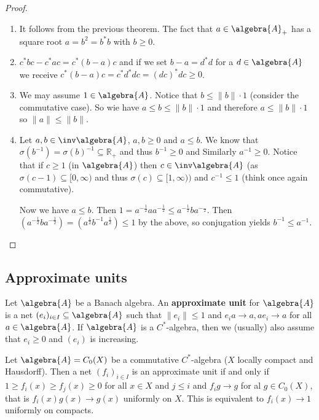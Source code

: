 \documentclass[a4paper]{article}
\begin{document}
\begin{proof}~
	\begin{enumerate}
		\item It follows from the previous theorem. The fact that $a \in \algebra{A}_+$ has a square root $a = b^2 = b^* b$  with $b \geq 0$.
		\item $c^* b c - c^* a c = c^* (b - a) c$ and if we set $b - a = d^* d$ for a $d \in \algebra{A}$ we receive $c^*(b-a)c = c^* d^* d c = (dc)^* dc \geq 0$.
		\item We may assume $1 \in \algebra{A}$.
		Notice that $b \leq \|b\| \cdot 1$ (consider the commutative case).
		So wie have $a \leq b \leq \|b\| \cdot 1$ and therefore $a \leq \|b\| \cdot 1$ so $\|a\| \leq \|b\|$.
		\item Let $a,b \in \inv \algebra{A}$, $a,b \geq 0$ and $a \leq b$.
		We know that $\sigma(b^{-1}) = \sigma(b)^{-1} \subseteq \mathds{R}_+$ and thus $b^{-1} \geq 0$ and Similarly $a^{-1} \geq 0$.
		Notice that if $c \geq 1$ (in $\algebra{A}$) then $c \in \inv \algebra{A}$ (as $\sigma(c-1) \subseteq [0, \infty)$ and thus $\sigma(c) \subseteq [1, \infty))$ and $c^{-1} \leq 1$ (think once again commutative).

		Now we have $a \leq b$.
		Then $1 = a^{-\frac{1}{2}} a a^{-\frac{1}{2}} \leq a^{-\frac{1}{2}} b a^{-\frac{}{2}}$.
		Then $(a^{-\frac{1}{2}} b a^{-\frac{1}{2}}) = (a^\frac{1}{2} b^{-1} a^\frac{1}{2}) \leq 1$ by the above, so conjugation yields $b^{-1} \leq a^{-1}$.
	\end{enumerate}
\end{proof}

\subsection{Approximate units}

\begin{definition}
	Let $\algebra{A}$ be a Banach algebra. An \textbf{approximate unit} for $\algebra{A}$ is a net $(e_i)_{i \in I} \subseteq \algebra{A}$ such that $\|e_i\| \leq 1$ and $e_i a \to a, a e_i \to a$ for all $a \in \algebra{A}$. If $\algebra{A}$ is a $C^*$-algebra, then we (usually) also assume that $e_i \geq 0$ and $(e_i)$ is increasing.
\end{definition}

\begin{example}
	Let $\algebra{A} = C_0(X)$ be a commutative $C^*$-algebra ($X$ locally compact and Hausdorff).
	Then a net $(f_i)_{i \in I}$ is an approximate unit if and only if $1 \geq f_i(x) \geq f_j(x) \geq 0$ for all $x \in X$ and $j \leq i$ and $f_i g \to g$ for al $g \in C_0(X)$, that is $f_i(x) g(x) \to g(x)$ uniformly on $X$.
	This is equivalent to $f_i(x) \to 1$ uniformly on compacts.
\end{example}
\end{document}
